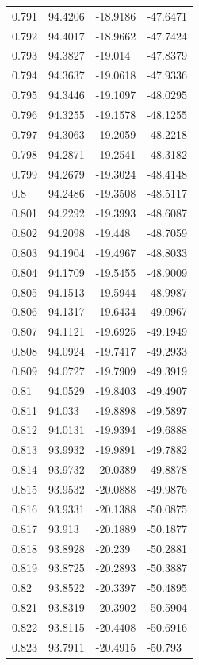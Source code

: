 \begin{tabular}{llll}
0.791 & 94.4206 & -18.9186 & -47.6471 \\
0.792 & 94.4017 & -18.9662 & -47.7424 \\
0.793 & 94.3827 & -19.014 & -47.8379 \\
0.794 & 94.3637 & -19.0618 & -47.9336 \\
0.795 & 94.3446 & -19.1097 & -48.0295 \\
0.796 & 94.3255 & -19.1578 & -48.1255 \\
0.797 & 94.3063 & -19.2059 & -48.2218 \\
0.798 & 94.2871 & -19.2541 & -48.3182 \\
0.799 & 94.2679 & -19.3024 & -48.4148 \\
0.8 & 94.2486 & -19.3508 & -48.5117 \\
0.801 & 94.2292 & -19.3993 & -48.6087 \\
0.802 & 94.2098 & -19.448 & -48.7059 \\
0.803 & 94.1904 & -19.4967 & -48.8033 \\
0.804 & 94.1709 & -19.5455 & -48.9009 \\
0.805 & 94.1513 & -19.5944 & -48.9987 \\
0.806 & 94.1317 & -19.6434 & -49.0967 \\
0.807 & 94.1121 & -19.6925 & -49.1949 \\
0.808 & 94.0924 & -19.7417 & -49.2933 \\
0.809 & 94.0727 & -19.7909 & -49.3919 \\
0.81 & 94.0529 & -19.8403 & -49.4907 \\
0.811 & 94.033 & -19.8898 & -49.5897 \\
0.812 & 94.0131 & -19.9394 & -49.6888 \\
0.813 & 93.9932 & -19.9891 & -49.7882 \\
0.814 & 93.9732 & -20.0389 & -49.8878 \\
0.815 & 93.9532 & -20.0888 & -49.9876 \\
0.816 & 93.9331 & -20.1388 & -50.0875 \\
0.817 & 93.913 & -20.1889 & -50.1877 \\
0.818 & 93.8928 & -20.239 & -50.2881 \\
0.819 & 93.8725 & -20.2893 & -50.3887 \\
0.82 & 93.8522 & -20.3397 & -50.4895 \\
0.821 & 93.8319 & -20.3902 & -50.5904 \\
0.822 & 93.8115 & -20.4408 & -50.6916 \\
0.823 & 93.7911 & -20.4915 & -50.793 \\

\end{tabular}
